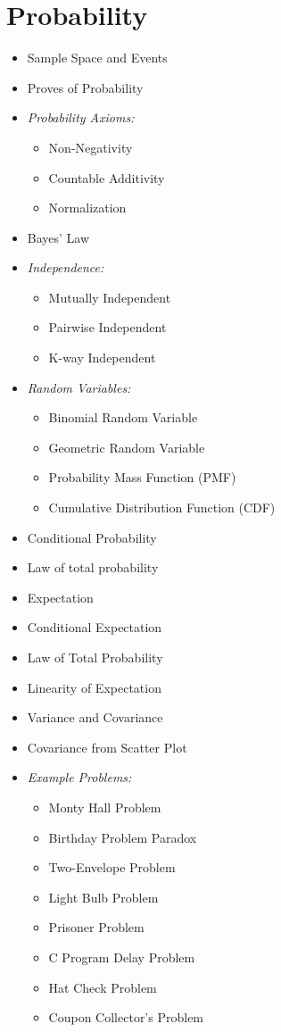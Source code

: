 \documentclass[11pt]{article}
\begin{document}
\section{Probability}
\begin{itemize}
\item Sample Space and Events
\item Proves of Probability
\item \emph{Probability Axioms:}
\begin{itemize}
\item Non-Negativity
\item Countable Additivity
\item Normalization
\end{itemize}
\item Bayes’ Law
\item \emph{Independence:}
\begin{itemize}
\item Mutually Independent
\item Pairwise Independent
\item K-way Independent
\end{itemize}
\item \emph{Random Variables:}
\begin{itemize}
\item Binomial Random Variable
\item Geometric Random Variable
\item Probability Mass Function (PMF)
\item Cumulative Distribution Function (CDF)
\end{itemize}
\item Conditional Probability
\item Law of total probability
\item Expectation 
\item Conditional Expectation
\item Law of Total Probability
\item Linearity of Expectation
\item Variance and Covariance
\item Covariance from Scatter Plot
\pagebreak
\item \emph{Example Problems:}
\begin{itemize}
\item Monty Hall Problem
\item Birthday Problem Paradox
\item Two-Envelope Problem
\item Light Bulb Problem
\item Prisoner Problem
\item C Program Delay Problem
\item Hat Check Problem
\item Coupon Collector's Problem
\end{itemize}
\end{itemize} 
\end{document}
